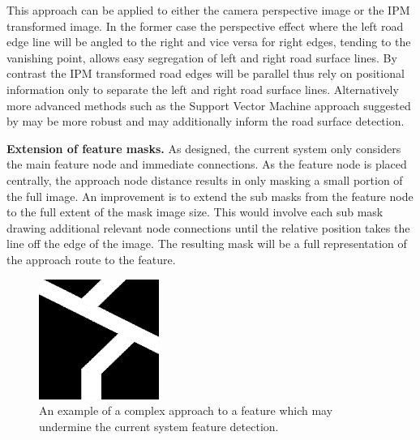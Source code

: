 \documentclass{article}
\begin{document}
This approach can be applied to either the camera perspective image or the IPM transformed image. In the former case the perspective effect where the left road edge line will be angled to the right and vice versa for right edges, tending to the vanishing point, allows easy segregation of left and right road surface lines. By contrast the IPM transformed road edges will be parallel thus rely on positional information only to separate the left and right road surface lines. Alternatively more advanced methods such as the Support Vector Machine approach suggested by \citet{moncularLaneDetectAndTrack} may be more robust and may additionally inform the road surface detection.



\textbf{Extension of feature masks.} As designed, the current system only considers the main feature node and immediate connections. As the feature node is placed centrally, the approach node distance results in only masking a small portion of the full image. An improvement is to extend the sub masks from the feature node to the full extent of the mask image size. This would involve each sub mask drawing additional relevant node connections until the relative position takes the line off the edge of the image. The resulting mask will be a full representation of the approach route to the feature.

\begin{figure} %
	\centering
	\includegraphics[width=0.35\textwidth]{complexFeatureApproach.png}
	\caption{An example of a complex approach to a feature which may undermine the current system feature detection.}
	\label{f:complexFeatureApproach}
\end{figure}
\end{document}

